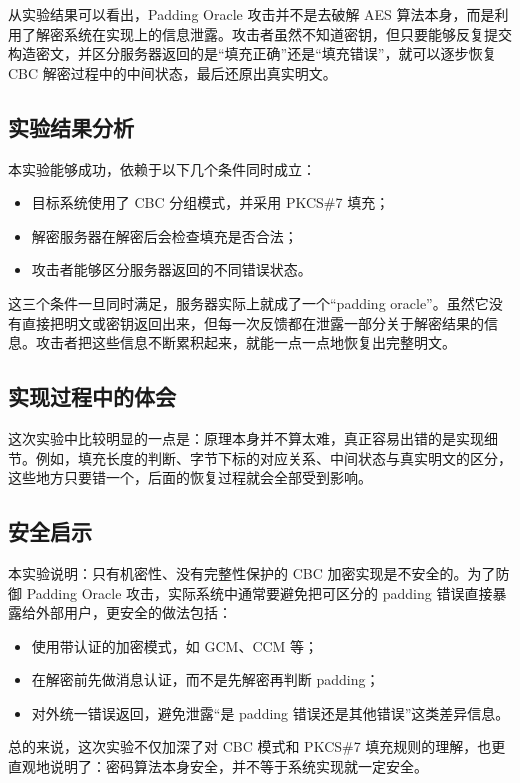 从实验结果可以看出，Padding Oracle 攻击并不是去破解 AES 算法本身，而是利用了解密系统在实现上的信息泄露。攻击者虽然不知道密钥，但只要能够反复提交构造密文，并区分服务器返回的是“填充正确”还是“填充错误”，就可以逐步恢复 CBC 解密过程中的中间状态，最后还原出真实明文。

\subsection{实验结果分析}

本实验能够成功，依赖于以下几个条件同时成立：
\begin{itemize}
    \item 目标系统使用了 CBC 分组模式，并采用 PKCS\#7 填充；
    \item 解密服务器在解密后会检查填充是否合法；
    \item 攻击者能够区分服务器返回的不同错误状态。
\end{itemize}

这三个条件一旦同时满足，服务器实际上就成了一个“padding oracle”。虽然它没有直接把明文或密钥返回出来，但每一次反馈都在泄露一部分关于解密结果的信息。攻击者把这些信息不断累积起来，就能一点一点地恢复出完整明文。

\subsection{实现过程中的体会}

这次实验中比较明显的一点是：原理本身并不算太难，真正容易出错的是实现细节。例如，填充长度的判断、字节下标的对应关系、中间状态与真实明文的区分，这些地方只要错一个，后面的恢复过程就会全部受到影响。

\subsection{安全启示}

本实验说明：只有机密性、没有完整性保护的 CBC 加密实现是不安全的。为了防御 Padding Oracle 攻击，实际系统中通常要避免把可区分的 padding 错误直接暴露给外部用户，更安全的做法包括：
\begin{itemize}
    \item 使用带认证的加密模式，如 GCM、CCM 等；
    \item 在解密前先做消息认证，而不是先解密再判断 padding；
    \item 对外统一错误返回，避免泄露“是 padding 错误还是其他错误”这类差异信息。
\end{itemize}

总的来说，这次实验不仅加深了对 CBC 模式和 PKCS\#7 填充规则的理解，也更直观地说明了：密码算法本身安全，并不等于系统实现就一定安全。
